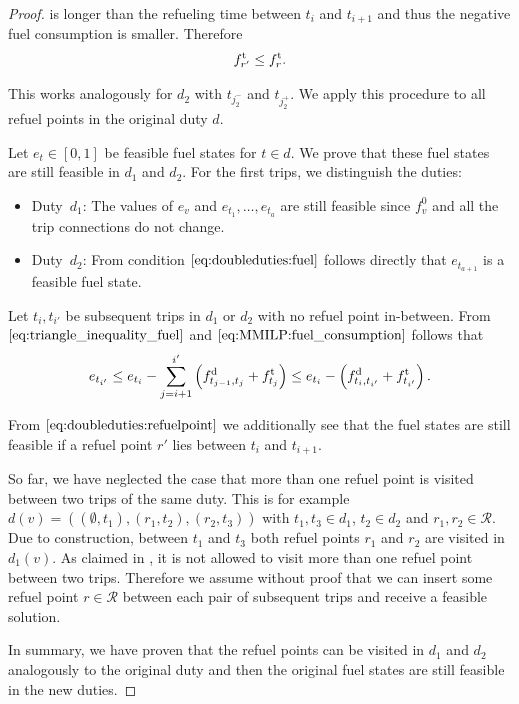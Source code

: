 \begin{proof}
is longer than the refueling time between $t_i$ and $t_{i+1}$ and thus the negative fuel consumption is smaller. Therefore
\begin{align}
	f^{\operatorname{t}}_{r'}\leq f^{\operatorname{t}}_{r}. \label{eq:doubleduties:refuelpoint}
\end{align}

This works analogously for $d_2$ with $t_{j^-_2}$ and $t_{j^+_2}$. We apply this procedure to all refuel points in the original duty $d$.

Let $e_t\in[0,1]$ be feasible fuel states for ${t\in d}$. We prove that these fuel states are still feasible in $d_1$ and $d_2$. For the first trips, we distinguish the duties:
\begin{itemize}
	\item{Duty~$d_1$:}
		The values of $e_v$ and ${e_{t_1},\dots,e_{t_a}}$ are still feasible since $f^0_v$ and all the trip connections do not change.
	\item{Duty~$d_2$:}
		From condition $\eqref{eq:doubleduties:fuel}$ follows directly that $e_{t_{a+1}}$ is a feasible fuel state.
\end{itemize}

Let $t_i,t_{i'}$ be subsequent trips in $d_1$ or $d_2$ with no refuel point in-between. From $\eqref{eq:triangle_inequality_fuel}$ and $\eqref{eq:MMILP:fuel_consumption}$ follows that
\begin{align*}
	e_{t_{i'}} \leq e_{t_i} - \sum_{j=i+1}^{i'} \left(f^{\operatorname{d}}_{t_{j-1},t_j}+f^{\operatorname{t}}_{t_j}\right) \leq e_{t_i} - \left(f^{\operatorname{d}}_{t_i,t_{i'}} + f^{\operatorname{t}}_{t_{i'}}\right).
\end{align*}

From $\eqref{eq:doubleduties:refuelpoint}$ we additionally see that the fuel states are still feasible if a refuel point $r'$ lies between $t_i$ and $t_{i+1}$.

So far, we have neglected the case that more than one refuel point is visited between two trips of the same duty. This is for example ${d(v)=\left(\left(\emptyset, t_1\right),\left(r_1,t_2\right),\left(r_2,t_3\right)\right)}$ with ${t_1,t_3\in d_1}$, ${t_2\in d_2}$ and ${r_1,r_2\in\mathcal{R}}$. Due to construction, between $t_1$ and $t_3$ both refuel points $r_1$ and $r_2$ are visited in $d_1(v)$. As claimed in , it is not allowed to visit more than one refuel point between two trips. Therefore we assume without proof that we can insert some refuel point ${r\in\mathcal{R}}$ between each pair of subsequent trips and receive a feasible solution.

In summary, we have proven that the refuel points can be visited in $d_1$ and $d_2$ analogously to the original duty and then the original fuel states are still feasible in the new duties.


\end{proof}
